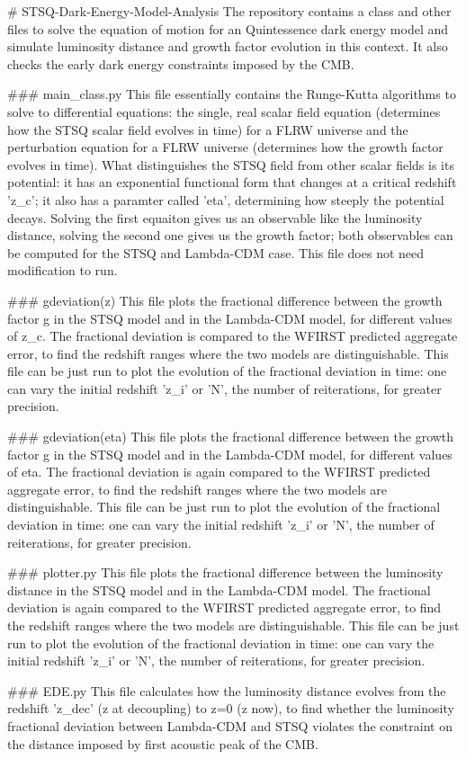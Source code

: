 # STSQ-Dark-Energy-Model-Analysis
The repository contains a class and other files to solve the equation of motion for an Quintessence dark energy model and simulate luminosity distance and growth factor evolution in this context. It also checks the early dark energy constraints imposed by the CMB.

  ### main_class.py
  This file essentially contains the Runge-Kutta algorithms to solve to differential equations: the single, real scalar field equation (determines how the STSQ scalar field evolves in time) for a FLRW universe and the perturbation equation for a FLRW universe (determines how the growth factor evolves in time). What distinguishes the STSQ field from other scalar fields is its potential: it has an exponential functional form that changes at a critical redshift 'z_c'; it also has a paramter called 'eta', determining how steeply the potential decays. Solving the first equaiton gives us an observable like the luminosity distance, solving the second one gives us the growth factor; both observables can be computed for the STSQ and Lambda-CDM case. This file does not need modification to run.

  ### gdeviation(z)
  This file plots the fractional difference between the growth factor g in the STSQ model and in the Lambda-CDM model, for different values of z_c. The fractional deviation is compared to the WFIRST predicted aggregate error, to find the redshift ranges where the two models are distinguishable. This file can be just run to plot the evolution of the fractional deviation in time: one can vary the initial redshift 'z_i' or 'N', the number of reiterations, for greater precision.

  ### gdeviation(eta)
  This file plots the fractional difference between the growth factor g in the STSQ model and in the Lambda-CDM model, for different values of eta. The fractional deviation is again compared to the WFIRST predicted aggregate error, to find the redshift ranges where the two models are distinguishable. This file can be just run to plot the evolution of the fractional deviation in time: one can vary the initial redshift 'z_i' or 'N', the number of reiterations, for greater precision.

  ### plotter.py
  This file plots the fractional difference between the luminosity distance in the STSQ model and in the Lambda-CDM model. The fractional deviation is again compared to the WFIRST predicted aggregate error, to find the redshift ranges where the two models are distinguishable. This file can be just run to plot the evolution of the fractional deviation in time: one can vary the initial redshift 'z_i' or 'N', the number of reiterations, for greater precision.

  ### EDE.py
  This file calculates how the luminosity distance evolves from the redshift 'z_dec' (z at decoupling) to z=0 (z now), to find whether the luminosity fractional deviation between Lambda-CDM and STSQ violates the constraint on the distance imposed by first acoustic peak of the CMB. 
